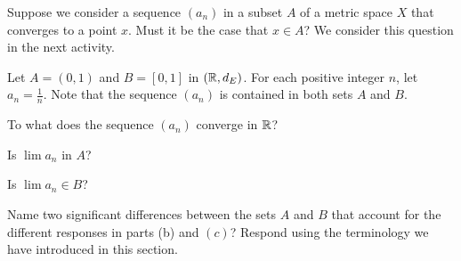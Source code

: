 \begin{comment}

\ActivitySolution

\ba
\item Since $x \in \overline{A} \cap \overline{X \setminus A}$, it is the case that $x \in \overline{A}$ and $x \in \overline{X \setminus A}$.

\item 
	\begin{enumerate}[i.]
	\item Suppose $x \in A$. Then $N$ contains a point, namely $x$, in $A$. Now $x \notin X \setminus A$ and $x \in \overline{X \setminus A}$ means that $N$ contains a point in $X \setminus A$ different from $x$. So $N$ contains a point in $A$ and a point in $X \setminus A$, which implies $x \in \Bdry(A)$. 
	
	\item Suppose $x \notin A$. Then $N$ contains a point, namely $x$, in $X \setminus A$. Now $x \notin A$ and $x \in \overline{A}$ means that $N$ contains a point in $A$ different from $x$. So $N$ contains a point in $A$ and a point in $X \setminus A$, which implies $x \in \Bdry(A)$. 
		
	\item In either case we have $x \in \Bdry(A)$ and so $\overline{A} \cap \overline{X \setminus A} \subseteq \Bdry(A)$. The two containments show that $\Bdry(A) = \overline{A} \cap \overline{X \setminus A}$.

		
	\end{enumerate}

\ea

\end{comment}

\label{sec_closed_limits_seq}

Suppose we consider a sequence $(a_n)$ in a subset $A$ of a metric space $X$ that converges to a point $x$. Must it be the case that $x \in A$? We consider this question in the next activity. 

\begin{activity} \label{act:closed_limitpoints} Let $A = (0,1)$ and $B = [0,1]$ in $(\mathbb{R}, d_E)$. For each positive integer $n$, let $a_n =\frac{1}{n}$. Note that the sequence $(a_n)$ is contained in both sets $A$ and $B$.
\ba
\item To what does the sequence $(a_n)$ converge in $\mathbb{R}$?   

\item Is $\lim a_n$ in $A$? 

\item Is $\lim a_n \in B$?

\item Name two significant differences between the sets $A$ and $B$ that account for the different responses in parts (b) and $(c)$? Respond using the terminology we have introduced in this section. 

\ea

\end{activity}

